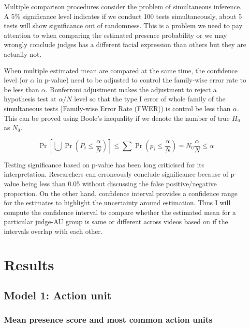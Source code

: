 \documentclass{monashthesis}
\begin{document}
Multiple comparison procedures consider the problem of simultaneous inference. A 5\% significance level indicates if we conduct 100 tests simultaneously, about 5 tests will show significance out of randomness. This is a problem we need to pay attention to when comparing the estimated presence probability or we may wrongly conclude judges has a different facial expression than others but they are actually not.

When multiple estimated mean are compared at the same time, the confidence level (or \(\alpha\) in p-value) need to be adjusted to control the family-wise error rate to be less than \(\alpha\). Bonferroni adjustment makes the adjustment to reject a hypothesis test at \(\alpha/N\) level so that the type I error of whole family of the simultaneous tests (Family-wise Error Rate (FWER)) is control be less than \(\alpha\). This can be proved using Boole's inequality if we denote the number of true \(H_0\) as \(N_0\).

\[\Pr\left[\bigcup \Pr(P_i \le\frac{\alpha}{N})\right] \le \sum \Pr\left(p_i \le \frac{\alpha}{N}\right) = N_0\frac{\alpha}{N} \le \alpha\]

Testing significance based on p-value has been long criticised for its interpretation. Researchers can erroneously conclude significance because of p-value being less than 0.05 without discussing the false positive/negative proportion. On the other hand, confidence interval provides a confidence range for the estimates to highlight the uncertainty around estimation. Thus I will compute the confidence interval to compare whether the estimated mean for a particular judge-AU group is same or different across videos based on if the intervals overlap with each other.

\hypertarget{results}{%
\chapter{Results}\label{results}}

\hypertarget{model-1-action-unit-1}{%
\section{Model 1: Action unit}\label{model-1-action-unit-1}}

\hypertarget{mean-presence-score-and-most-common-action-units}{%
\subsection{Mean presence score and most common action units}\label{mean-presence-score-and-most-common-action-units}}
\end{document}
